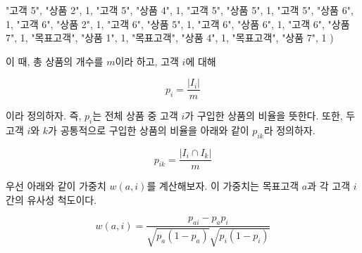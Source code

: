 \documentclass[
]{book}
\newenvironment{Shaded}{\begin{snugshade}}{\end{snugshade}}
\newcommand{\DecValTok}[1]{\textcolor[rgb]{0.00,0.00,0.81}{#1}}
\newcommand{\NormalTok}[1]{#1}
\newcommand{\StringTok}[1]{\textcolor[rgb]{0.31,0.60,0.02}{#1}}
\begin{document}
\begin{Shaded}
\begin{Highlighting}[]
  \StringTok{"고객 5"}\NormalTok{, }\StringTok{"상품 2"}\NormalTok{, }\DecValTok{1}\NormalTok{,}
  \StringTok{"고객 5"}\NormalTok{, }\StringTok{"상품 4"}\NormalTok{, }\DecValTok{1}\NormalTok{,}
  \StringTok{"고객 5"}\NormalTok{, }\StringTok{"상품 5"}\NormalTok{, }\DecValTok{1}\NormalTok{,}
  \StringTok{"고객 5"}\NormalTok{, }\StringTok{"상품 6"}\NormalTok{, }\DecValTok{1}\NormalTok{,}
  \StringTok{"고객 6"}\NormalTok{, }\StringTok{"상품 2"}\NormalTok{, }\DecValTok{1}\NormalTok{,}
  \StringTok{"고객 6"}\NormalTok{, }\StringTok{"상품 5"}\NormalTok{, }\DecValTok{1}\NormalTok{,}
  \StringTok{"고객 6"}\NormalTok{, }\StringTok{"상품 6"}\NormalTok{, }\DecValTok{1}\NormalTok{,}
  \StringTok{"고객 6"}\NormalTok{, }\StringTok{"상품 7"}\NormalTok{, }\DecValTok{1}\NormalTok{,}
  \StringTok{"목표고객"}\NormalTok{, }\StringTok{"상품 1"}\NormalTok{, }\DecValTok{1}\NormalTok{,}
  \StringTok{"목표고객"}\NormalTok{, }\StringTok{"상품 4"}\NormalTok{, }\DecValTok{1}\NormalTok{,}
  \StringTok{"목표고객"}\NormalTok{, }\StringTok{"상품 7"}\NormalTok{, }\DecValTok{1}
\NormalTok{)}
\end{Highlighting}
\end{Shaded}

이 때, 총 상품의 개수를 \(m\)이라 하고, 고객 \(i\)에 대해

\begin{equation*}
p_i = \frac{|I_i|}{m}
\end{equation*}

이라 정의하자. 즉, \(p_i\)는 전체 상품 중 고객 \(i\)가 구입한 상품의 비율을 뜻한다. 또한, 두 고객 \(i\)와 \(k\)가 공통적으로 구입한 상품의 비율을 아래와 같이 \(p_{ik}\)라 정의하자.

\begin{equation*}
p_{ik} = \frac{|I_i \cap I_k|}{m}
\end{equation*}

우선 아래와 같이 가중치 \(w(a, i)\)를 계산해보자. 이 가중치는 목표고객 \(a\)과 각 고객 \(i\)간의 유사성 척도이다.

\begin{equation*}
w(a, i) = \frac{p_{ai} - p_a p_i}{\sqrt{p_a (1 - p_a)} \sqrt{p_i (1 - p_i)}}
\end{equation*}
\end{document}
